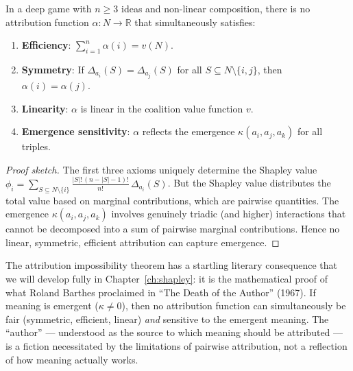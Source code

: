 \begin{theorem}
\label{thm:attribution-impossibility}
In a deep game with $n \geq 3$ ideas and non-linear composition, there is
no attribution function $\alpha\colon N \to \mathbb{R}$ that simultaneously
satisfies:
\begin{enumerate}
\item \textbf{Efficiency}: $\sum_{i=1}^{n} \alpha(i) = v(N)$.
\item \textbf{Symmetry}: If $\Delta_{a_i}(S) = \Delta_{a_j}(S)$ for all
  $S \subseteq N \setminus \{i, j\}$, then $\alpha(i) = \alpha(j)$.
\item \textbf{Linearity}: $\alpha$ is linear in the coalition value function
  $v$.
\item \textbf{Emergence sensitivity}: $\alpha$ reflects the emergence
  $\kappa(a_i, a_j, a_k)$ for all triples.
\end{enumerate}
\end{theorem}

\begin{proof}[Proof sketch]
The first three axioms uniquely determine the Shapley value
$\phi_i = \sum_{S \subseteq N \setminus \{i\}} \frac{|S|!\,(n - |S| - 1)!}{n!}
\,\Delta_{a_i}(S)$.  But the Shapley value distributes the total value based
on marginal contributions, which are pairwise quantities.  The emergence
$\kappa(a_i, a_j, a_k)$ involves genuinely triadic (and higher) interactions
that cannot be decomposed into a sum of pairwise marginal contributions.
Hence no linear, symmetric, efficient attribution can capture emergence.
\end{proof}

\begin{interpretation}
\label{interp:ch20:attribution_literary}
The attribution impossibility theorem has a startling literary
consequence that we will develop fully in Chapter~\ref{ch:shapley}: it
is the mathematical proof of what Roland Barthes proclaimed in ``The Death
of the Author'' (1967).  If meaning is emergent ($\kappa \neq 0$), then
no attribution function can simultaneously be fair (symmetric, efficient,
linear) \emph{and} sensitive to the emergent meaning.  The ``author'' ---
understood as the source to which meaning should be attributed --- is a
fiction necessitated by the limitations of pairwise attribution, not a
reflection of how meaning actually works.
\end{interpretation}

